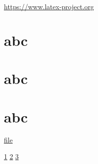 \documentclass{article}
\begin{document}
\url{https://www.latex-project.org}

\section{abc}\label{sec}

\section{abc}\label{sec2}

\section{abc}\label{sec3}

\href{example-image.pdf}{file}


\ref{sec} \quad  \ref{sec2} \quad \ref{sec3}
\newpage
\end{document}
